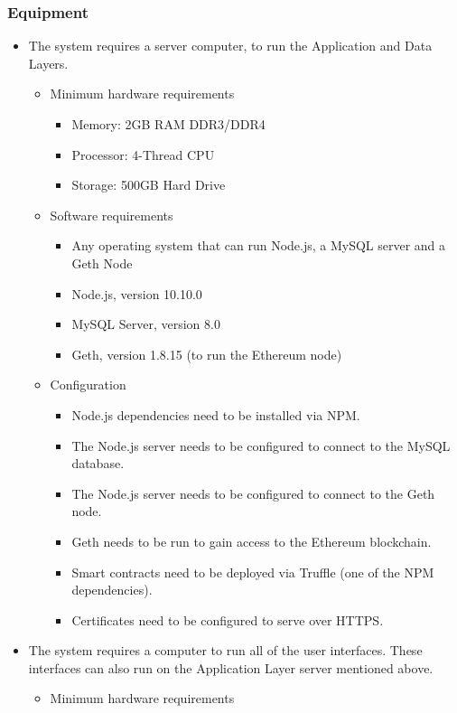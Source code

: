 \documentclass{article}
\begin{document}
\subsubsection*{Equipment}
\begin{itemize}
\item The system requires a server computer, to run the Application and Data Layers.
\begin{itemize}
\item Minimum hardware requirements
\begin{itemize}
\item Memory: 2GB RAM DDR3/DDR4
\item Processor: 4-Thread CPU
\item Storage: 500GB Hard Drive 
\end{itemize}
\item Software requirements
\begin{itemize}
\item Any operating system that can run Node.js, a MySQL server and a Geth Node
\item Node.js, version 10.10.0
\item MySQL Server, version 8.0
\item Geth, version 1.8.15 (to run the Ethereum node)
\end{itemize}
\item Configuration
\begin{itemize}
\item Node.js dependencies need to be installed via NPM.
\item The Node.js server needs to be configured to connect to the MySQL database.
\item The Node.js server needs to be configured to connect to the Geth node.
\item Geth needs to be run to gain access to the Ethereum blockchain.
\item Smart contracts need to be deployed via Truffle (one of the NPM dependencies).
\item Certificates need to be configured to serve over HTTPS.
\end{itemize}
\end{itemize}
\item The system requires a computer to run all of the user interfaces. These interfaces can also run on the Application Layer server mentioned above.
\begin{itemize}
\item Minimum hardware requirements
\begin{itemize}

\end{itemize}
\end{itemize}
\end{itemize}
\end{document}
